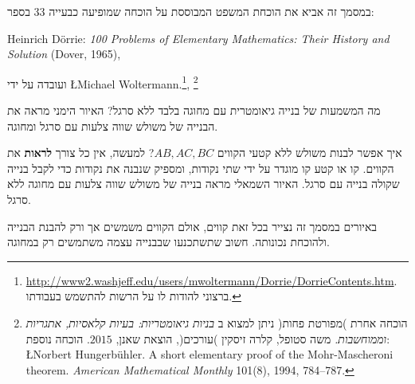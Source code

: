 \documentclass[12pt,a4paper]{article}
\begin{document}
במסמך זה אביא את הוכחת המשפט המבוססת על הוכחה שמופיעה כבעייה
$33$
בספר:

Heinrich D\"{o}rrie: \textit{100 Problems of Elementary Mathematics: Their History and Solution} (Dover, 1965),

ועובדה על ידי
\L{Michael Woltermann}.\footnote{\url{http://www2.washjeff.edu/users/mwoltermann/Dorrie/DorrieContents.htm}.
ברצוני להודות לו על הרשות להתשמש בעבודתו.
},%
\footnote{%
הוכחה אחרת )מפורטת פחות( ניתן למצוא ב%
\textit{%
בניות גיאומטריות: בעיות קלאסיות, אתגריות וממוחשבות.
}%
משה סטופל, קלרה זיסקין )עורכים(, הוצאת שאנן,
$2015$.
הוכחה נוספת:
\L{Norbert Hungerb\"{u}hler. A short elementary proof of the Mohr-Mascheroni theorem. \textit{American Mathematical Monthly} 101(8), 1994, 784--787.}%
}


מה המשמעות של בנייה גיאומטרית עם מחוגה בלבד ללא סרגל? האיור הימני מראה את הבנייה של משולש שווה צלעות עם סרגל ומחוגה.
\begin{center}
\end{center}
איך אפשר לבנות משולש ללא קטעי הקווים
$AB,AC,BC$?
למעשה, אין כל צורך
\textbf{לראות}
את הקווים. קו או קטע קו מוגדר על ידי שתי נקודות, ומספיק שנבנה את נקודות כדי לקבל בנייה שקולה בנייה עם סרגל. האיור השמאלי מראה בנייה של משולש שווה צלעות עם מחוגה ללא סרגל.

באיורים במסמך זה נצייר בכל זאת קווים, אולם הקווים משמשים אך ורק להבנת הבנייה ולהוכחת נכונותה. חשוב שתשתכנעו שבבנייה עצמה משתמשים רק במחוגה.
\end{document}
